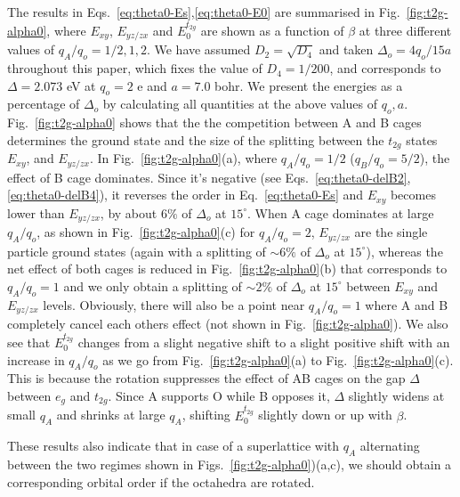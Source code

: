 \documentclass[a4paper,prb]{revtex4-1}  %
\newcommand{\com}[1]{}
\begin{document}
The results in Eqs.~\ref{eq:theta0-Es},\ref{eq:theta0-E0}
are summarised in Fig.~\ref{fig:t2g-alpha0},
where $E_{xy}$, $E_{yz/zx}$ and $E_0^{t_{2g}}$ are shown
as a function of $\beta$
at three different values of $q_A/q_o=1/2,1,2$.
We have 
assumed $D_2=\sqrt{D_4}$ and
taken $\Delta_o=4q_o/15a$ throughout this paper,
which fixes the value of $D_4=1/200$, 
and corresponds to $\Delta= 2.073$ eV at 
$q_o=2$ e and $a=7.0$ bohr.
We present the energies as a percentage of $\Delta_o$
by calculating all quantities at the above values of $q_o,a$.
Fig.~\ref{fig:t2g-alpha0} shows that
the the competition between A and B cages
determines the ground state and the size of the splitting between the 
$t_{2g}$ states
$E_{xy}$, and $E_{yz/zx}$.
In Fig.~\ref{fig:t2g-alpha0}(a),
where $q_A/q_o=1/2$ ($q_B/q_o=5/2$),
the effect of B cage dominates.
Since it's negative (see Eqs.~\ref{eq:theta0-delB2},\ref{eq:theta0-delB4}),
it reverses the order in Eq.~\ref{eq:theta0-Es}
and $E_{xy}$ becomes lower than $E_{yz/zx}$, by about $6\%$ of $\Delta_o$ at $15^\circ$.
When A cage dominates at large $q_A/q_o$,
as shown in Fig.~\ref{fig:t2g-alpha0}(c) for $q_A/q_o=2$,
$E_{yz/zx}$ are the single particle ground states (again with a splitting of $\sim6\%$ of $\Delta_o$ at $15^\circ$),
whereas the net effect of both cages
is reduced in Fig.~\ref{fig:t2g-alpha0}(b)
that corresponds to $q_A/q_o=1$
and we only obtain a splitting of $\sim2\%$ of $\Delta_o$ at $15^\circ$
between $E_{xy}$ and $E_{yz/zx}$ levels.
Obviously, there will also be a point near 
$q_A/q_o=1$ where A and B completely 
cancel each others effect (not shown in Fig.~\ref{fig:t2g-alpha0}).
We also see that $E_0^{t_{2g}}$ changes from a slight negative shift to a slight positive shift
with an increase in $q_A/q_o$ as we
go from Fig.~\ref{fig:t2g-alpha0}(a)
to Fig.~\ref{fig:t2g-alpha0}(c).
This is because the rotation suppresses the
effect of AB cages on the
gap $\Delta$ between $e_{g}$ and $t_{2g}$.
Since A supports O while B opposes it,
$\Delta$ slightly widens at small $q_A$ and shrinks at large $q_A$,
shifting $E_0^{t_{2g}}$ slightly down or up with $\beta$.

These results also indicate that in case of a superlattice with $q_A$ alternating
between the two regimes shown in Figs.~\ref{fig:t2g-alpha0})(a,c),
we should obtain a corresponding orbital order if the octahedra are rotated.





\com{
$\eta=\left(\frac{a\Delta_{O}}{q_o}\right)=\frac{4}{15}$
at $D_4=1/200$\\
$a=7$ bohr, and $\braket{r^4}=11.5809$ gives $2eV$ crystal field gap: $D_4=11.5809/a^4=0.004823365264473\simeq0.005=1/200=5\times10^{-3}$,
$D_2=\sqrt{D4}=0.0694503$,
$D_2/D_4\simeq 14$.
}
\com{$D_2/D_4$ ranges between $15$-$20$ for typical gaps of $2$-$1$ eV and $a\simeq 7$ bohr (and $q_o=2e$). 
It decreases with increasing gap as $1/\sqrt(gap)$, but is still $10$ at $gap=3.5$eV.
}
\end{document}
